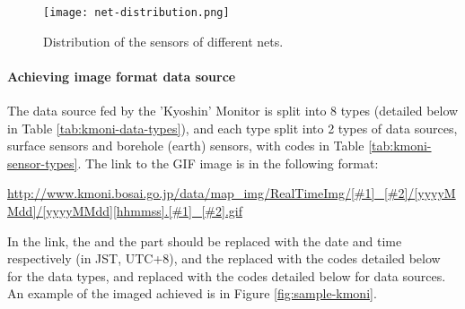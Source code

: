 \begin{figure}[!ht]
    \centering
    \texttt{[image: net-distribution.png]}
    \caption{Distribution of the sensors of different nets.}
    \label{fig:net-distribution}
\end{figure}


\paragraph{Achieving image format data source}

The data source fed by the 'Kyoshin' Monitor is split into 8 types (detailed below in Table \ref{tab:kmoni-data-types}), and each type split into 2 types of data sources, surface sensors and borehole (earth) sensors, with codes in Table \ref{tab:kmoni-sensor-types}. The link to the GIF image is in the following format:

\begin{center}
    \url{http://www.kmoni.bosai.go.jp/data/map_img/RealTimeImg/[#1]_[#2]/[yyyyMMdd]/[yyyyMMdd][hhmmss].[#1]_[#2].gif}
\end{center}

In the link, the \Code{[yyyyMMdd]} and the \Code{[hhmmss]} part should be replaced with the date and time respectively (in JST, UTC+8), and the  replaced with the codes detailed below for the data types, and  replaced with the codes detailed below for data sources. An example of the imaged achieved is in Figure \ref{fig:sample-kmoni}.


